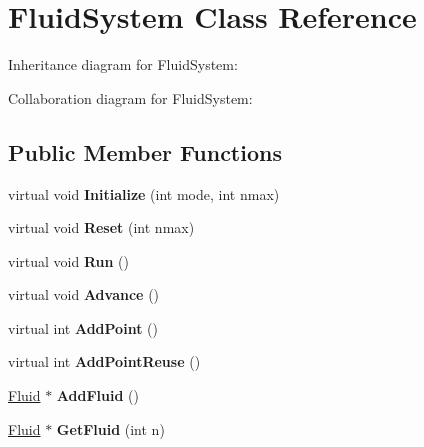\hypertarget{class_fluid_system}{\section{Fluid\+System Class Reference}
\label{class_fluid_system}
}


Inheritance diagram for Fluid\+System\+:


Collaboration diagram for Fluid\+System\+:
\subsection*{Public Member Functions}
\begin{DoxyCompactItemize}
\item 
\hypertarget{class_fluid_system_a7590d10c2c5641da38938f07849854e1}{virtual void {\bfseries Initialize} (int mode, int nmax)}\label{class_fluid_system_a7590d10c2c5641da38938f07849854e1}

\item 
\hypertarget{class_fluid_system_a1b5188d8d451b795fc70257253738cec}{virtual void {\bfseries Reset} (int nmax)}\label{class_fluid_system_a1b5188d8d451b795fc70257253738cec}

\item 
\hypertarget{class_fluid_system_a965c0daeb99bb0876b00d6c95b939b3c}{virtual void {\bfseries Run} ()}\label{class_fluid_system_a965c0daeb99bb0876b00d6c95b939b3c}

\item 
\hypertarget{class_fluid_system_aa82849612e66774bec58e4a5e155c5bd}{virtual void {\bfseries Advance} ()}\label{class_fluid_system_aa82849612e66774bec58e4a5e155c5bd}

\item 
\hypertarget{class_fluid_system_a60ed59ec8775fe6bd5ed1387ce09062f}{virtual int {\bfseries Add\+Point} ()}\label{class_fluid_system_a60ed59ec8775fe6bd5ed1387ce09062f}

\item 
\hypertarget{class_fluid_system_abe4e12ed3a70ddc69148d84f02778d6c}{virtual int {\bfseries Add\+Point\+Reuse} ()}\label{class_fluid_system_abe4e12ed3a70ddc69148d84f02778d6c}

\item 
\hypertarget{class_fluid_system_a74b6c29070fb637882a39125cc326d72}{\hyperlink{struct_fluid}{Fluid} $\ast$ {\bfseries Add\+Fluid} ()}\label{class_fluid_system_a74b6c29070fb637882a39125cc326d72}

\item 
\hypertarget{class_fluid_system_ad3c0199a9103f487d67c033c521cd9bc}{\hyperlink{struct_fluid}{Fluid} $\ast$ {\bfseries Get\+Fluid} (int n)}\label{class_fluid_system_ad3c0199a9103f487d67c033c521cd9bc}


\end{DoxyCompactItemize}
